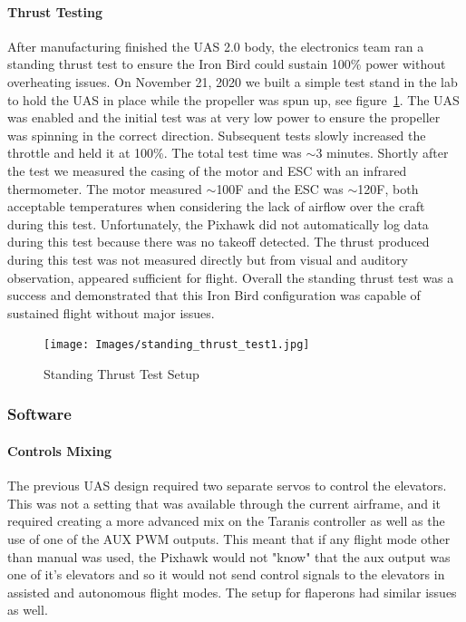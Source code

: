\documentclass{article}
\begin{document}
\paragraph{Thrust Testing}
After manufacturing finished the UAS 2.0 body, the electronics team ran a standing thrust test to ensure the Iron Bird could sustain 100\% power without overheating issues. On November 21, 2020 we built a simple test stand in the lab to hold the UAS in place while the propeller was spun up, see figure~\ref{fig:standingThrustStand}. The UAS was enabled and the initial test was at very low power to ensure the propeller was spinning in the correct direction. Subsequent tests slowly increased the throttle and held it at 100\%. The total test time was $\sim$3 minutes. Shortly after the test we measured the casing of the motor and ESC with an infrared thermometer. The motor measured $\sim$100\degree F and the ESC was $\sim$120\degree F, both acceptable temperatures when considering the lack of airflow over the craft during this test. Unfortunately, the Pixhawk did not automatically log data during this test because there was no takeoff detected. The thrust produced during this test was not measured directly but from visual and auditory observation, appeared sufficient for flight. Overall the standing thrust test was a success and demonstrated that this Iron Bird configuration was capable of sustained flight without major issues.

\begin{figure}[!h]
    \centering
    \texttt{[image: Images/standing\_thrust\_test1.jpg]}
    \caption{Standing Thrust Test Setup}
    \label{fig:standingThrustStand}
\end{figure}


\subsubsection{Software}
\paragraph{Controls Mixing}\label{mixing}
The previous UAS design required two separate servos to control the elevators. This was not a setting that was available through the current airframe, and it required creating a more advanced mix on the Taranis controller as well as the use of one of the AUX PWM outputs. This meant that if any  flight mode other than manual was used, the Pixhawk would not "know" that the aux output was one of it's elevators and so it would not send control signals to the elevators in assisted and autonomous flight modes. The setup for flaperons had similar issues as well.
\end{document}
